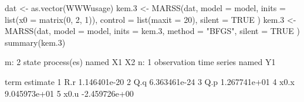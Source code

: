 \begin{Schunk}
\begin{Sinput}
 dat <- as.vector(WWWusage)
 kem.3 <- MARSS(dat,
   model = model, inits = list(x0 = matrix(0, 2, 1)),
   control = list(maxit = 20), silent = TRUE
 )
 kem.3 <- MARSS(dat,
   model = model, inits = kem.3,
   method = "BFGS", silent = TRUE
 )
 summary(kem.3)
\end{Sinput}
\begin{Soutput}
m: 2 state process(es) named X1 X2
n: 1 observation time series named Y1

  term      estimate
1  R.r  1.146401e-20
2  Q.q  6.363461e-24
3  Q.p  1.267741e+01
4 x0.x  9.045973e+01
5 x0.u -2.459726e+00
\end{Soutput}
\end{Schunk}
